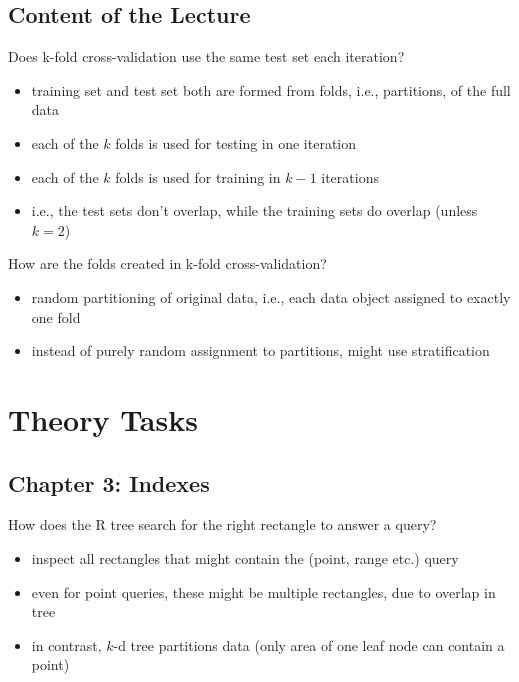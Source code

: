 \documentclass[12pt]{article}
\begin{document}
\subsection*{Content of the Lecture}

\begin{question}
	Does k-fold cross-validation use the same test set each iteration?
\end{question}

\begin{itemize}[left=0pt, nosep]
	\item training set and test set both are formed from folds, i.e., partitions, of the full data
	\item each of the $k$ folds is used for testing in one iteration
	\item each of the $k$ folds is used for training in $k-1$ iterations
	\item i.e., the test sets don't overlap, while the training sets do overlap (unless $k=2$)
\end{itemize}

\begin{question}
	How are the folds created in k-fold cross-validation?
\end{question}

\begin{itemize}[left=0pt, nosep]
	\item random partitioning of original data, i.e., each data object assigned to exactly one fold
	\item instead of purely random assignment to partitions, might use stratification
\end{itemize}

\newpage

\section*{Theory Tasks}

\subsection*{Chapter 3: Indexes}

\begin{question}
	How does the R tree search for the right rectangle to answer a query?
\end{question}

\begin{itemize}[left=0pt, nosep]
	\item inspect all rectangles that might contain the (point, range etc.) query
	\item even for point queries, these might be multiple rectangles, due to overlap in tree
	\item in contrast, $k$-d tree partitions data (only area of one leaf node can contain a point)
\end{itemize}
\end{document}
